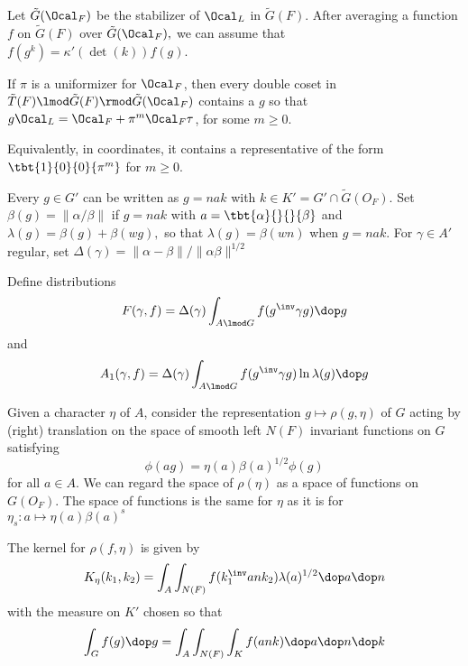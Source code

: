 Let $\tilde{G}(\Ocal_F)$ be the stabilizer of $\Ocal_L$ in $\tilde{G}(F)$. After averaging a function $f$ on $\tilde{G}(F)$ over $\tilde{G}(\Ocal_F),$ we can assume that $f(g^k)=\kappa'(\det(k))f(g)$.

If $\pi$ is a uniformizer for $\Ocal_F$, then every double coset in $\tilde{T}(F)\lmod \tilde{G}(F) \rmod \tilde{G}(\Ocal_F)$ contains a $g$ so that $g\Ocal_L=\Ocal_F + \pi ^m \Ocal_F \tau$, for some $m \geq 0$.

Equivalently, in coordinates, it contains a representative of the form $\tbt{1}{0}{0}{\pi^m}$ for $m\geq 0$.



Every $g \in G'$ can be written as $g = n a k$ with $k \in K' = G' \cap \tilde{G}(O_F).$ Set $\beta(g) = \|\alpha/\beta\|$ if $g= n a k$ with $a =\tbt{\alpha}{}{}{\beta}$ and $\lambda(g) = \beta(g) + \beta(wg),$ so that $\lambda(g) = \beta(wn)$ when $g=nak$. For $\gamma \in A'$ regular, set $\Delta(\gamma) = \| \alpha - \beta \|/\| \alpha \beta \|^{1/2}$

Define distributions
\[ F(\gamma, f) = \Delta(\gamma) \int_{A \lmod G} f(g^\inv \gamma g ) \dop g \]
and
\[ A_1(\gamma, f) = \Delta(\gamma) \int_{A\lmod G} f(g^\inv \gamma g ) \ln \lambda(g) \dop g\]


Given a character $\eta$ of $A$, consider the representation $g \mapsto \rho(g,\eta)$ of $G$ acting by (right) translation on the space of smooth left $N(F)$ invariant functions on $G$ satisfying
\[ \phi(ag) = \eta (a)\beta(a)^{1/2}\phi(g) \]
for all $a \in A$. We can regard the space of $\rho(\eta)$ as a space of functions on $G(O_F).$ The space of functions is the same for $\eta$ as it is for $\eta_s: a \mapsto \eta(a) \beta(a)^s$

The kernel for $\rho(f,\eta)$ is given by
\[ K_\eta(k_1,k_2) = \int_A \int_{N(F)} f(k_1^\inv a n k_2 ) \lambda(a)^{1/2} \dop a \dop n\]
with the measure on $K'$ chosen so that
\[ \int_G f(g) \dop g = \int_A \int_{N(F)} \int_K f(ank) \dop a \dop n \dop k\]






